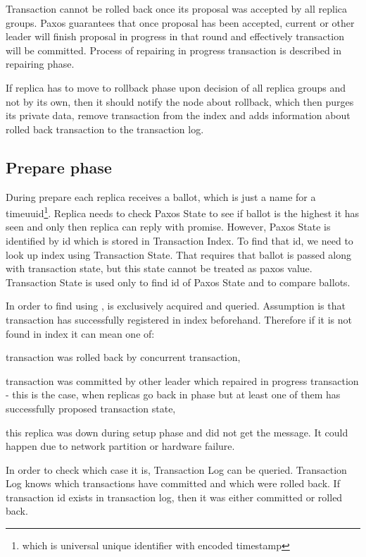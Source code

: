 Transaction cannot be rolled back once its proposal was accepted by all replica groups. Paxos guarantees that once proposal has been accepted, current or other leader will finish proposal in progress in that round and effectively transaction will be committed. Process of repairing in progress transaction is described in repairing phase.

If replica has to move to rollback phase upon decision of all replica groups and not by its own, then it should notify the node about rollback, which then purges its private data, remove transaction from the index and adds information about rolled back transaction to the transaction log.


\subsection{Prepare phase}
During prepare each replica receives a ballot, which is just a name for a timeuuid\footnote{which is universal unique identifier with encoded timestamp}. Replica needs to check Paxos State to see if ballot is the highest it has seen and only then replica can reply with promise. However, Paxos State is identified by id which is stored in Transaction Index. To find that id, we need to look up index using Transaction State. That requires that ballot is passed along with transaction state, but this state cannot be treated as paxos value. Transaction State is used only to find id of Paxos State and to compare ballots.

In order to find \paxosRoundId using \txState, \txIndex is exclusively acquired and queried. Assumption is that transaction has successfully registered in index beforehand. Therefore if it is not found in index it can mean one of:
\begin{enumerate*}
\item transaction was rolled back by concurrent transaction,
\item transaction was committed by other leader which repaired in progress transaction - this is the case, when replicas go back in phase but at least one of them has successfully proposed transaction state,
\item this replica was down during setup phase and did not get the message. It could happen due to network partition or hardware failure.
\end{enumerate*}


In order to check which case it is, Transaction Log can be queried. Transaction Log knows which transactions have committed and which were rolled back. If transaction id exists in transaction log, then it was either committed or rolled back.


